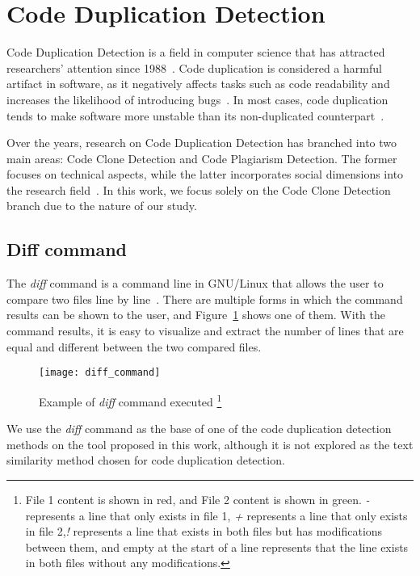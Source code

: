 \en

\section{Code Duplication Detection}

Code Duplication Detection is a field in computer science that has attracted
researchers' attention since 1988~\citep{firstman}. Code
duplication is considered a harmful artifact in software, as it negatively
affects tasks such as code readability and increases the likelihood of
introducing bugs~\citep{harmone}. In most cases, code duplication tends to make
software more unstable than its non-duplicated counterpart~\citep{harmtwo}.

Over the years, research on Code Duplication Detection has branched into two
main areas: Code Clone Detection and Code Plagiarism Detection. The former
focuses on technical aspects, while the latter incorporates social dimensions
into the research field~\citep{litreview}. In this work, we focus solely on the
Code Clone Detection branch due to the nature of our study.


\subsection{Diff command}

The \textit{diff} command is a command line in GNU/Linux that allows the user to compare 
two files line by line~\citep{diffcommand}. There are multiple forms in which the command 
results can be shown to the user, and Figure~\ref{fig:diff} shows one of them. 
With the command results, it is easy to visualize and extract the number of lines that 
are equal and different between the two compared files.

\begin{figure}
\texttt{[image: diff\_command]}
\caption[Example of \textit{diff} command executed]{
Example of \textit{diff} command executed
\footnote{
File 1 content is shown in red, and File 2 content is shown in green. \textit{-} 
represents a line that only exists in file 1, \textit{+} represents a line that only 
exists in file 2,\textit{!} represents a line that exists in both files but has modifications 
between them, and empty at the start of a line represents that the line exists in 
both files without any modifications.
}
}
\label{fig:diff}
\end{figure}

We use the \textit{diff} command as the base of one of the code duplication detection 
methods on the tool proposed in this work, although it is not explored as the text 
similarity method chosen for code duplication detection.

